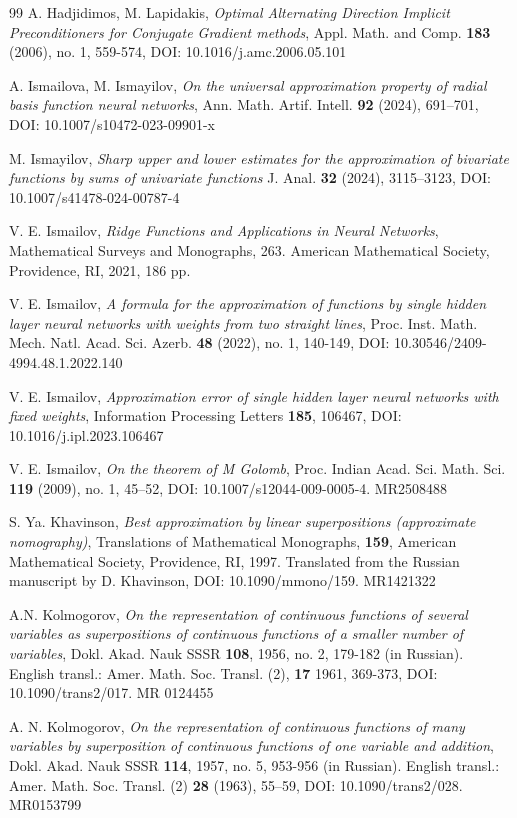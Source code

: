 \documentclass[12p]{article}
\numberwithin{equation}{section}
\begin{document}
\begin{thebibliography}{99}
A. Hadjidimos, M. Lapidakis, {\it Optimal Alternating Direction Implicit Preconditioners
for Conjugate Gradient methods}, Appl. Math. and Comp. {\bf 183} (2006), no. 1, 559-574, DOI: 10.1016/j.amc.2006.05.101

A. Ismailova, M. Ismayilov, {\it On the universal approximation property of radial basis function neural networks}, Ann. Math. Artif. Intell. {\bf 92} (2024), 691–701, DOI: 10.1007/s10472-023-09901-x

M. Ismayilov, {\it Sharp upper and lower estimates for the approximation of bivariate functions by sums of univariate functions} J. Anal. {\bf 32} (2024), 3115–3123, DOI: 10.1007/s41478-024-00787-4 


V. E. Ismailov, {\it Ridge Functions and Applications in Neural Networks}, Mathematical Surveys and Monographs, 263. American Mathematical Society, Providence, RI, 2021, 186 pp.

V. E. Ismailov, {\it A formula for the approximation of functions by single hidden layer neural networks with weights from two straight lines}, Proc. Inst. Math. Mech. Natl. Acad. Sci. Azerb. {\bf 48} (2022), no. 1, 140-149, DOI: 10.30546/2409-4994.48.1.2022.140

V. E. Ismailov, {\it Approximation error of single hidden layer neural networks with fixed weights}, Information Processing Letters {\bf 185}, 106467, DOI: 10.1016/j.ipl.2023.106467

V. E. Ismailov, {\it On the theorem of M Golomb}, Proc. Indian Acad. Sci. Math. Sci. {\bf 119} (2009), no. 1, 45–52, DOI: 10.1007/s12044-009-0005-4. MR2508488

S. Ya. Khavinson, {\it Best approximation by linear superpositions (approximate nomography)}, Translations of Mathematical Monographs, {\bf 159}, American Mathematical Society, Providence, RI, 1997. Translated from the Russian manuscript by D. Khavinson, DOI: 10.1090/mmono/159. MR1421322

A.N. Kolmogorov, {\it On the representation of continuous functions of several variables as superpositions of continuous functions of a smaller number of variables}, Dokl. Akad. Nauk SSSR {\bf 108}, 1956, no. 2, 179-182 (in Russian). English transl.: Amer. Math. Soc. Transl. (2), {\bf 17} 1961, 369-373, DOI: 10.1090/trans2/017. MR 0124455

A. N. Kolmogorov, {\it On the representation of continuous functions of many variables by superposition of continuous functions of one variable and addition},  Dokl. Akad. Nauk SSSR {\bf 114}, 1957, no. 5, 953-956 (in Russian). English transl.: Amer. Math. Soc. Transl. (2) {\bf 28} (1963), 55–59, DOI: 10.1090/trans2/028. MR0153799


\end{thebibliography}
\end{document}
